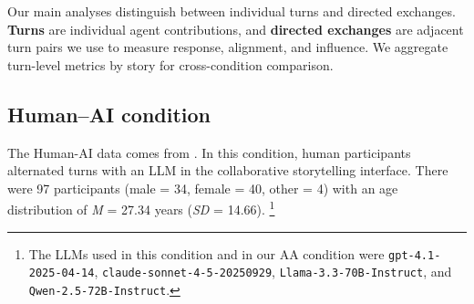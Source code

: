 \documentclass[11pt]{article}
\begin{document}
Our main analyses distinguish between individual turns and directed exchanges. \textbf{Turns} are individual agent contributions, and \textbf{directed exchanges} are adjacent turn pairs we use to measure response, alignment, and influence. We aggregate turn-level metrics by story for cross-condition comparison.

\subsection{Human--AI condition}
The Human-AI data comes from \citet{fundal2026directionalalignmentnarrativeagency}. In this condition, human participants alternated turns with an LLM in the collaborative storytelling interface. There were 97 participants (male = 34, female = 40, other = 4) with an age distribution of \textit{M} = 27.34 years (\textit{SD} = 14.66). 
\footnote{
The LLMs used in this condition and in our AA condition were \texttt{gpt-4.1-2025-04-14}, \texttt{claude-sonnet-4-5-20250929}, \texttt{Llama-3.3-70B-Instruct}, and \texttt{Qwen-2.5-72B-Instruct}.}
\end{document}
